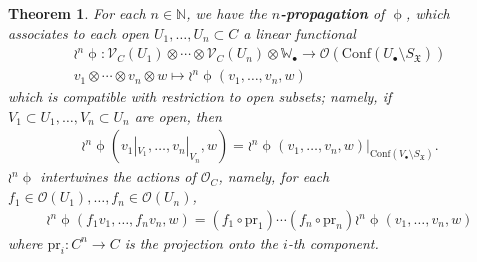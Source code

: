 \documentclass[12pt,a4paper,notitlepage]{article}
\theoremstyle{definition}
\theoremstyle{plain}
\newtheorem{thm}[df]{Theorem}
\newcommand{\fk}{\mathfrak}
\newcommand{\Conf}{\mathrm{Conf}}
\newcommand{\scr}{\mathscr}
\newcommand{\SX}{{S_{\fk X}}}
\newcommand{\blt}{\bullet}
\newcommand{\Wbb}{\mathbb W}
\newcommand{\Nbb}{\mathbb N}
\newcommand{\pr}{\mathrm {pr}}
\numberwithin{equation}{subsection}
\begin{document}
\begin{thm}\label{lb7}
For each $n\in\Nbb$, we have the \textbf{$n$-propagation} of $\upphi$, which associates to each open $U_1,\dots,U_n\subset C$ a linear functional 
\begin{gather*}
\wr^n\upphi:\scr V_C(U_1)\otimes\cdots\otimes\scr V_C(U_n)\otimes\Wbb_\blt\rightarrow\scr O(\Conf(U_\blt\setminus\SX))\\
v_1\otimes\cdots\otimes v_n\otimes w\mapsto \wr^n\upphi(v_1,\dots,v_n,w)
\end{gather*}
which is compatible with restriction to open subsets; namely, if $V_1\subset U_1,\dots,V_n\subset U_n$ are open, then
\begin{align*}
\wr^n\upphi(v_1|_{V_1},\dots,v_n|_{V_n},w)=\wr^n\upphi(v_1,\dots,v_n,w)\big|_{\Conf(V_\blt\setminus\SX)}.	
\end{align*}
$\wr^n\upphi$ intertwines the actions of $\scr O_C$, namely, for each $f_1\in\scr O(U_1),\dots,f_n\in\scr O(U_n)$,
\begin{align*}
\wr^n\upphi(f_1v_1,\dots,f_nv_n,w)=(f_1\circ\pr_1)\cdots (f_n\circ\pr_n)\wr^n\upphi(v_1,\dots,v_n,w)	
\end{align*}
where $\pr_i:C^n\rightarrow C$ is the projection onto the $i$-th component. 



\end{thm}
\end{document}
